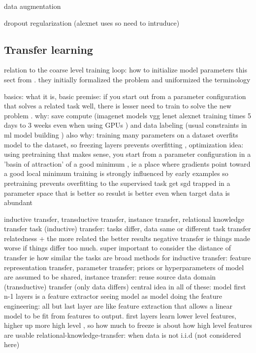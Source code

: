 \documentclass{article}
\begin{document}
data augmentation

dropout regularization (alexnet uses so need to intruduce)

\subsection{Transfer learning}

relation to the coarse level training loop: how to initialize model parameters
this sect from \cite{transferlearning_survey}. they initially formalized the problem and uniformized 
the terminology

basics: what it is, basic premise: if you start out from a parameter configuration that solves a related 
task well, there is lesser need to train to solve the new problem \cite{transferlearning_survey}.
why: save compute (imagenet models vgg lenet alexnet training times 5 days to 3 weeks even when using GPUs \cite{vgg}) and data labeling (usual constraints in ml model building \cite{engbook})
also why: training many parameters on a dataset overfits model to the dataset, so freezing layers prevents overfitting \cite{googlelenet},
optimization idea: using pretraining that makes sense, you start from a parameter configuration in a 'basin of attraction'
of a good minimum \cite{erhanWhyDoesUnsupervised2010}, ie a place where gradients point toward a good local minimum
    training is strongly influenced by early examples so pretraining prevents overfitting to the supervised task 
    get sgd trapped in a parameter space that is better so resulst is better even when target data is abundant \cite{erhanWhyDoesUnsupervised2010}    

inductive transfer, transductive transfer, instance transfer, relational knowledge transfer
task (inductive) transfer: tasks differ, data same or different
task transfer relatedness + the more related the better results
    negative transfer ie things made worse if things differ too much.
    super important to consider the distance of transfer ie how similar the tasks are
broad methods for inductive transfer: feature representation transfer, parameter transfer; priors or hyperparameters of model are assumed to be shared,
instance transfer: reuse source data
domain (transductive) transfer (only data differs)
central idea in all of these: model first n-1 layers is a feature extractor
seeing model as model doing the feature engineering: all but last layer are like 
feature extraction that allows a linear model to be fit from features to output.
    first layers learn lower level features, higher up more high level \cite{erhanWhyDoesUnsupervised2010}, so how much to freeze is about how
    high level features are usable     
relational-knowledge-transfer: when data is not i.i.d (not considered here)
\end{document}
